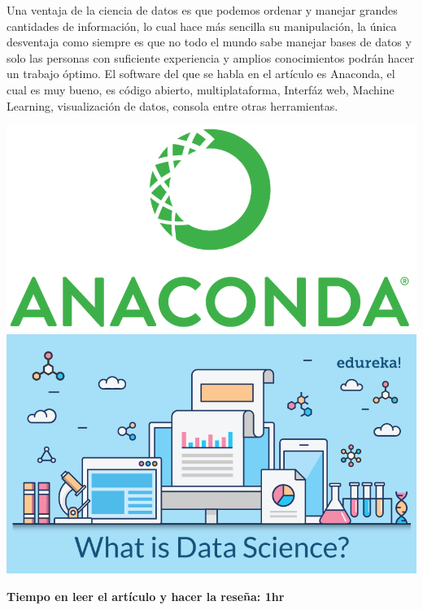 \documentclass[a4paper, 11pt, oneside]{article}
\begin{document}
 Una ventaja de la ciencia de datos es que podemos ordenar y manejar grandes cantidades de información, lo cual hace más sencilla su manipulación, la única desventaja como siempre es que no todo el mundo sabe manejar bases de datos y solo las personas con suficiente experiencia y amplios conocimientos podrán hacer un trabajo óptimo. El software del que se habla en el artículo es Anaconda, el cual es muy bueno, es código abierto, multiplataforma, Interfáz web, Machine Learning, visualización de datos, consola entre otras herramientas.
 \vfill
 \begin{center}
     \includegraphics[scale=0.40]{anaconda.png}
     \includegraphics[scale=0.30]{DataS.png}
 \end{center}
 \textbf{Tiempo en leer el artículo y hacer la reseña: 1hr}

\end{document}
